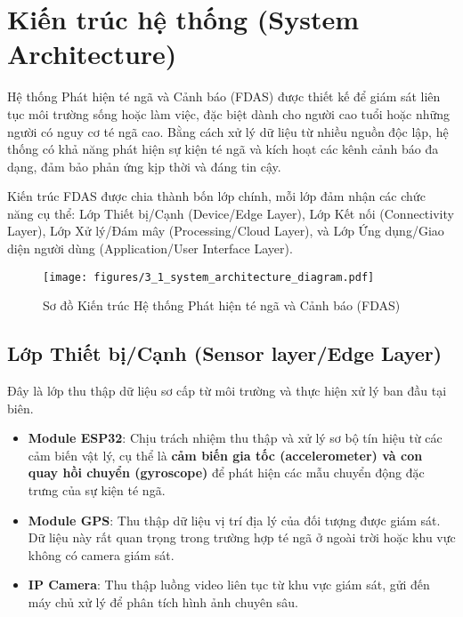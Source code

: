 
\section{Kiến trúc hệ thống (System Architecture)}
\label{sec:system_architecture}

Hệ thống Phát hiện té ngã và Cảnh báo (FDAS) được thiết kế để giám sát liên tục môi trường sống hoặc làm việc, đặc biệt dành cho người cao tuổi hoặc những người có nguy cơ té ngã cao. Bằng cách xử lý dữ liệu từ nhiều nguồn độc lập, hệ thống có khả năng phát hiện sự kiện té ngã và kích hoạt các kênh cảnh báo đa dạng, đảm bảo phản ứng kịp thời và đáng tin cậy.

Kiến trúc FDAS được chia thành bốn lớp chính, mỗi lớp đảm nhận các chức năng cụ thể: 
Lớp Thiết bị\slash Cạnh (Device\slash Edge Layer), 
Lớp Kết nối (Connectivity Layer), 
Lớp Xử lý\slash Đám mây (Processing\slash Cloud Layer), 
và Lớp Ứng dụng\slash Giao diện người dùng (Application\slash User Interface Layer).
\begin{figure}[H]
    \centering
    \texttt{[image: figures/3\_1\_system\_architecture\_diagram.pdf]}
    \caption{Sơ đồ Kiến trúc Hệ thống Phát hiện té ngã và Cảnh báo (FDAS)}
    \label{fig:system_architecture}
\end{figure}

\subsection{Lớp Thiết bị\slash Cạnh (Sensor layer\slash Edge Layer)}
Đây là lớp thu thập dữ liệu sơ cấp từ môi trường và thực hiện xử lý ban đầu tại biên.
\begin{itemize}
    \item \textbf{Module ESP32}: Chịu trách nhiệm thu thập và xử lý sơ bộ tín hiệu từ các cảm biến vật lý, cụ thể là \textbf{cảm biến gia tốc (accelerometer) và con quay hồi chuyển (gyroscope)} để phát hiện các mẫu chuyển động đặc trưng của sự kiện té ngã.
    \item \textbf{Module GPS}: Thu thập dữ liệu vị trí địa lý của đối tượng được giám sát. Dữ liệu này rất quan trọng trong trường hợp té ngã ở ngoài trời hoặc khu vực không có camera giám sát.
    \item \textbf{IP Camera}: Thu thập luồng video liên tục từ khu vực giám sát, gửi đến máy chủ xử lý để phân tích hình ảnh chuyên sâu.
\end{itemize}

